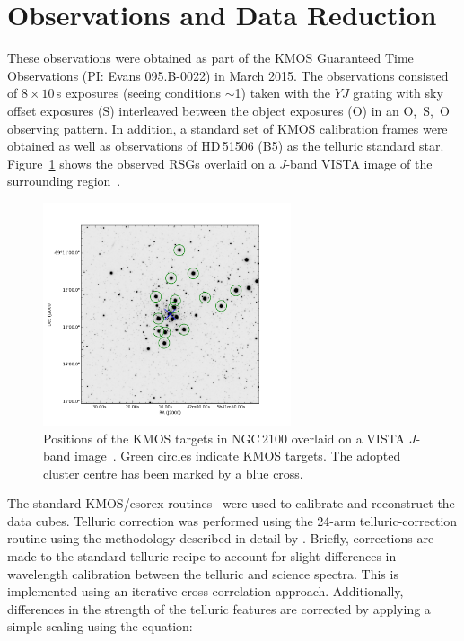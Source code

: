 \section{Observations and Data Reduction} %
\label{sec:ngc2100obs}
These observations were obtained as part of the KMOS Guaranteed Time Observations (PI: Evans 095.B-0022) in March 2015.
The observations consisted of $8\times10$\,s exposures (seeing conditions $\sim$1) taken with the $YJ$ grating with sky offset exposures (S) interleaved between the object exposures (O) in an O,~S,~O observing pattern.
In addition, a standard set of KMOS calibration frames were obtained as well as observations of HD\,51506 (B5) as the telluric standard star.
Figure~\ref{fig:targets} shows the observed RSGs overlaid on a {\it J}-band VISTA image of the surrounding region~\citep{2011A&A...527A.116C}.

\begin{figure}
\centering
 \includegraphics[width=0.65\textwidth]{ngc2100/NGC2100-targets}
 \caption[NGC\,2100 Targets]{Positions of the KMOS targets in NGC\,2100 overlaid on a VISTA $J$-band image~\citep{2011A&A...527A.116C}.
          Green circles indicate KMOS targets.
          The adopted cluster centre has been marked by a blue cross.\label{fig:targets}
          }
\end{figure}

The standard KMOS/esorex routines~\citep[SPARK;][]{2013A&A...558A..56D} were used to calibrate and reconstruct the data cubes.
Telluric correction was performed using the 24-arm telluric-correction routine using the methodology described in detail by
\citet{2015ApJ...803...14P}.
Briefly, corrections are made to the standard telluric recipe to account for slight differences in wavelength calibration between the telluric and science spectra.
This is implemented using an iterative cross-correlation approach.
Additionally, differences in the strength of the telluric features are corrected by applying a simple scaling using the equation:

